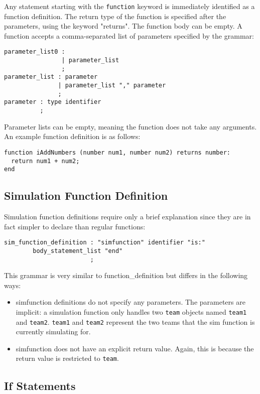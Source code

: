 Any statement starting with the \texttt{function} keyword is
immediately identified as a function definition. The return type of
the function is specified after the parameters, using the keyword
"returns". The function body can be empty. A function accepts a
comma-separated list of parameters specified by the grammar:

\begin{verbatim}
parameter_list0 :
                | parameter_list
                ;
parameter_list : parameter
               | parameter_list "," parameter
               ;
parameter : type identifier
          ;
\end{verbatim}

Parameter lists can be empty, meaning the function does not take any
arguments. An example function definition is as follows:

\begin{verbatim}
function iAddNumbers (number num1, number num2) returns number:
  return num1 + num2;
end
\end{verbatim}

\subsection{Simulation Function Definition}\label{SimDef}
Simulation function definitions require only a brief explanation since
they are in fact simpler to declare than regular functions:

\begin{verbatim}
sim_function_definition : "simfunction" identifier "is:"
        body_statement_list "end"
                        ;
\end{verbatim}

This grammar is very similar to function\_definition but differs in the
following ways: 

\begin{itemize}
\item
  simfunction definitions do not specify any parameters. The
  parameters are implicit: a simulation function only handles two
  \texttt{team} objects named \texttt{team1} and
  \texttt{team2}. \texttt{team1} and \texttt{team2} represent the two
  teams that the sim function is currently simulating for.
\item
  simfunction does not have an explicit return value. Again, this is
  because the return value is restricted to \texttt{team}.
\end{itemize}

\subsection{If Statements}

